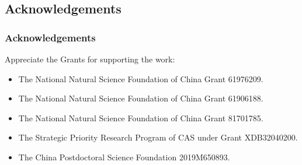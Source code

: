 \documentclass[aspectratio=169]{beamer}
\begin{document}
\subsection{Acknowledgements}
\begin{frame}
    \frametitle{Acknowledgements}
    Appreciate the Grants for supporting the work:
    \begin{itemize}
        \item The National Natural Science Foundation of China Grant 61976209.
        \item The National Natural Science Foundation of China Grant 61906188.
        \item The National Natural Science Foundation of China Grant 81701785.
        \item The Strategic Priority Research Program of CAS under Grant XDB32040200.
        \item The China Postdoctoral Science Foundation 2019M650893.
    \end{itemize}
\end{frame}
\end{document}
